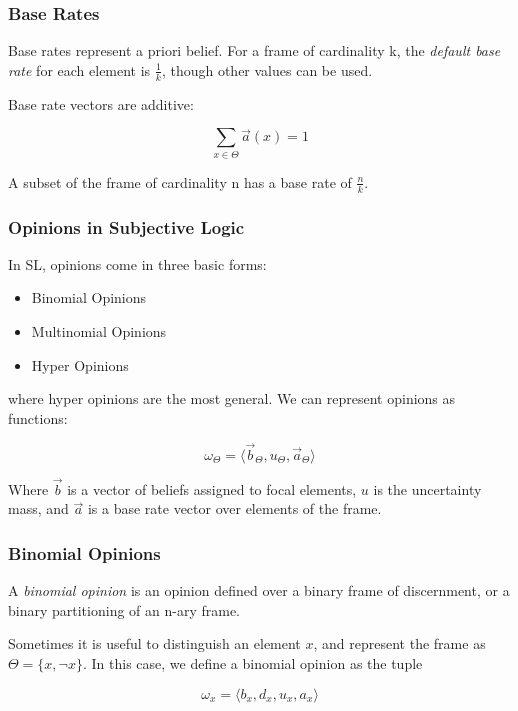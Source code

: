 \documentclass{beamer}
\begin{document}

\begin{frame}
\frametitle{Base Rates}

Base rates represent a priori belief. For a frame of cardinality k, the
\emph{default base rate} for each element is $\frac{1}{k}$, though other values
can be used.

Base rate vectors are additive:

$$
\sum_{x \in \Theta} \vec{a}\left(x\right) = 1
$$

A subset of the frame of cardinality n has a base rate of $\frac{n}{k}$.

\end{frame}


\begin{frame}
\frametitle{Opinions in Subjective Logic}

In SL, opinions come in three basic forms:

\begin{itemize}
  \item Binomial Opinions
  \item Multinomial Opinions
  \item Hyper Opinions
\end{itemize}

where hyper opinions are the most general. We can represent opinions as functions:

$$
\omega_\Theta = \langle \vec{b}_\Theta, u_\Theta, \vec{a}_\Theta \rangle
$$

Where $\vec{b}$ is a vector of beliefs assigned to focal elements,
$u$ is the uncertainty mass, and
$\vec{a}$ is a base rate vector over elements of the frame.

\end{frame}



\begin{frame}
\frametitle{Binomial Opinions}

A \emph{binomial opinion} is an opinion defined over a binary frame of discernment, or
a binary partitioning of an n-ary frame.

Sometimes it is useful to distinguish an element $x$, and represent the frame as
$\Theta = \lbrace x, \lnot x \rbrace$. In this case, we define a binomial opinion as
the tuple

$$
\omega_x = \langle b_x, d_x, u_x, a_x \rangle
$$


\end{frame}
\end{document}
